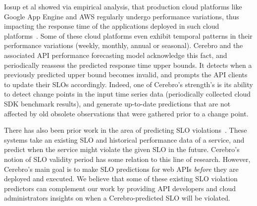 Iosup et al showed via empirical analysis, that production cloud platforms like Google App Engine and AWS regularly
undergo performance variations, thus impacting the response time of the applications deployed in such
cloud platforms~\cite{5948601}. Some of these cloud platforms even exhibit temporal patterns 
in their performance variations (weekly, monthly, annual or seasonal). Cerebro and the associated API performance
forecasting model acknowledge this fact, and periodically reassess the predicted response time upper bounds.
It detects when a previously predicted upper bound becomes invalid, and prompts the API clients to update their
SLOs accordingly. Indeed, one of Cerebro's strength's is its ability to detect change points in the input time series
data (periodically collected cloud SDK benchmark results), and generate up-to-date predictions that are not 
affected by old obsolete observations that were gathered prior to a change point.

There has also been prior work in the area of predicting 
SLO violations~\cite{Leitner10,6976585,Duan:2006:PIP:1142473.1142582}. 
These systems take an existing SLO and historical performance data of a service, and predict when the 
service might violate the given SLO in the future. 
Cerebro's notion of SLO validity period has some relation to this line of research. However,
Cerebro's main goal is to make SLO predictions for web APIs \textit{before} 
they are deployed and executed. We believe that
some of these existing SLO violation predictors can complement our 
work by providing API developers and cloud
administrators insights on when a Cerebro-predicted SLO will be violated.
